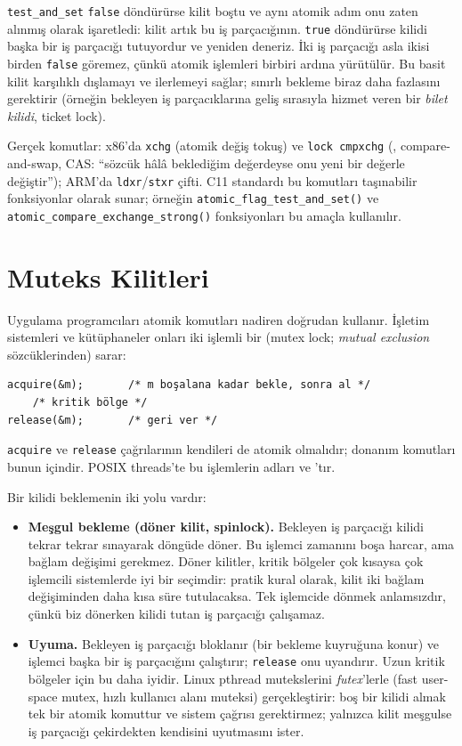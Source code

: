\texttt{test\_and\_set} \texttt{false} döndürürse kilit boştu ve aynı atomik adım onu zaten alınmış olarak işaretledi: kilit artık bu iş parçacığının. \texttt{true} döndürürse kilidi başka bir iş parçacığı tutuyordur ve yeniden deneriz. İki iş parçacığı asla ikisi birden \texttt{false} göremez, çünkü atomik işlemleri birbiri ardına yürütülür. Bu basit kilit karşılıklı dışlamayı ve ilerlemeyi sağlar; sınırlı bekleme biraz daha fazlasını gerektirir (örneğin bekleyen iş parçacıklarına geliş sırasıyla hizmet veren bir \emph{bilet kilidi}, ticket lock).

Gerçek komutlar: x86'da \texttt{xchg} (atomik değiş tokuş) ve \texttt{lock cmpxchg} (, compare-and-swap, CAS: ``sözcük hâlâ beklediğim değerdeyse onu yeni bir değerle değiştir''); ARM'da \texttt{ldxr}/\texttt{stxr} çifti. C11 standardı bu komutları taşınabilir fonksiyonlar olarak sunar; örneğin \texttt{atomic\_flag\_\allowbreak test\_and\_set()} ve \texttt{atomic\_compare\_\allowbreak exchange\_strong()} fonksiyonları bu amaçla kullanılır.

\section{Muteks Kilitleri}

Uygulama programcıları atomik komutları nadiren doğrudan kullanır. İşletim sistemleri ve kütüphaneler onları iki işlemli bir  (mutex lock; \emph{mutual exclusion} sözcüklerinden) sarar:
\begin{lstlisting}
acquire(&m);       /* m boşalana kadar bekle, sonra al */
    /* kritik bölge */
release(&m);       /* geri ver */
\end{lstlisting}
\texttt{acquire} ve \texttt{release} çağrılarının kendileri de atomik olmalıdır; donanım komutları bunun içindir. POSIX threads'te bu işlemlerin adları  ve 'tır.

Bir kilidi beklemenin iki yolu vardır:
\begin{itemize}
  \item \textbf{Meşgul bekleme (döner kilit, spinlock).} Bekleyen iş parçacığı kilidi tekrar tekrar sınayarak döngüde döner. Bu işlemci zamanını boşa harcar, ama bağlam değişimi gerekmez. Döner kilitler, kritik bölgeler çok kısaysa çok işlemcili sistemlerde iyi bir seçimdir: pratik kural olarak, kilit iki bağlam değişiminden daha kısa süre tutulacaksa. Tek işlemcide dönmek anlamsızdır, çünkü biz dönerken kilidi tutan iş parçacığı çalışamaz.
  \item \textbf{Uyuma.} Bekleyen iş parçacığı bloklanır (bir bekleme kuyruğuna konur) ve işlemci başka bir iş parçacığını çalıştırır; \texttt{release} onu uyandırır. Uzun kritik bölgeler için bu daha iyidir. Linux pthread mutekslerini \emph{futex}'lerle (fast user-space mutex, hızlı kullanıcı alanı muteksi) gerçekleştirir: boş bir kilidi almak tek bir atomik komuttur ve sistem çağrısı gerektirmez; yalnızca kilit meşgulse iş parçacığı çekirdekten kendisini uyutmasını ister.
\end{itemize}

